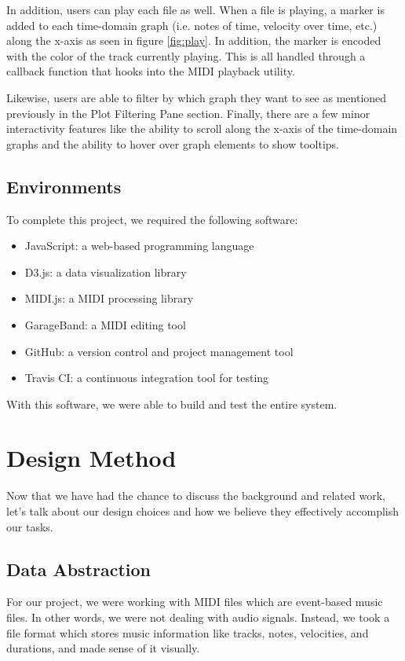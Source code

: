 \documentclass[journal]{vgtc}                %
\begin{document}
In addition, users can play each file as well. When a file is playing, a marker
is added to each time-domain graph (i.e. notes of time, velocity over time, etc.)
along the x-axis as seen in figure \ref{fig:play}. In addition, the marker is
encoded with the color of the track currently playing. This is all handled
through a callback function that hooks into the MIDI playback utility.

Likewise, users are able to filter by which graph they want to see as mentioned
previously in the Plot Filtering Pane section. Finally, there are a few minor
interactivity features like the ability to scroll along the x-axis of the
time-domain graphs and the ability to hover over graph elements to show tooltips.

\subsection{Environments}

To complete this project, we required the following software:

\begin{itemize}
  \item JavaScript: a web-based programming language
  \item D3.js: a data visualization library
  \item MIDI.js: a MIDI processing library
  \item GarageBand: a MIDI editing tool
  \item GitHub: a version control and project management tool
  \item Travis CI: a continuous integration tool for testing
\end{itemize}

With this software, we were able to build and test the entire system.

\section{Design Method}

Now that we have had the chance to discuss the background and related work,
let's talk about our design choices and how we believe they effectively
accomplish our tasks.

\subsection{Data Abstraction}

For our project, we were working with MIDI files which are event-based music
files. In other words, we were not dealing with audio signals. Instead, we took
a file format which stores music information like tracks, notes, velocities, and
durations, and made sense of it visually.
\end{document}
